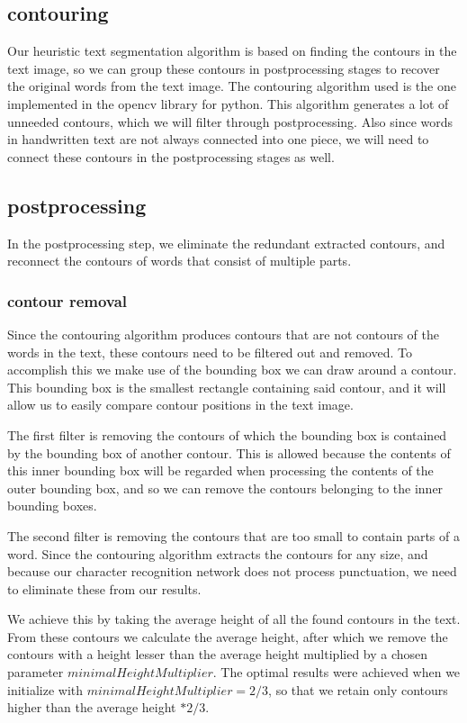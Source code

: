 \documentclass{article}
\begin{document}
\subsection{contouring}
Our heuristic text segmentation algorithm is based on finding the contours in the text image, so we can group these contours in postprocessing stages to recover the original words from the text image.
The contouring algorithm used is the one implemented in the opencv library for python.
This algorithm generates a lot of unneeded contours, which we will filter through postprocessing.
Also since words in handwritten text are not always connected into one piece, we will need to connect these contours in the postprocessing stages as well.

\subsection{postprocessing}
In the postprocessing step, we eliminate the redundant extracted contours, and reconnect the contours of words that consist of multiple parts.

\subsubsection{contour removal}
Since the contouring algorithm produces contours that are not contours of the words in the text, these contours need to be filtered out and removed.
To accomplish this we make use of the bounding box we can draw around a contour.
This bounding box is the smallest rectangle containing said contour, and it will allow us to easily compare contour positions in the text image.

The first filter is removing the contours of which the bounding box is contained by the bounding box of another contour.
This is allowed because the contents of this inner bounding box will be regarded when processing the contents of the outer bounding box, and so we can remove the contours belonging to the inner bounding boxes.

The second filter is removing the contours that are too small to contain parts of a word.
Since the contouring algorithm extracts the contours for any size, and because our character recognition network does not process punctuation,
we need to eliminate these from our results.

We achieve this by taking the average height of all the found contours in the text.
From these contours we calculate the average height, after which we remove the contours with a height lesser than the average height multiplied by a chosen parameter $minimalHeightMultiplier$.
The optimal results were achieved when we initialize with $minimalHeightMultiplier = 2/3$, so that we retain only contours higher than the average height $ * 2/3$.
\end{document}
